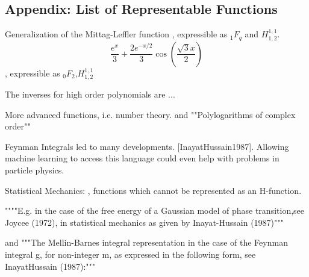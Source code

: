 \documentclass{article}
\begin{document}

\subsection{Appendix: List of Representable Functions}
Generalization of the Mittag-Leffler function \citep{Rathie2017}, expressible as $_1F_q$ and $H^{1,1}_{1,2}$.
$$
\frac{e^x}{3} + \frac{2 e^{-x/2}}{3}\cos(\frac{\sqrt{3}x}{2})
$$ \citep{Rathie2017}, expressible as $_0F_2$,$H^{1,1}_{1,2}$


The inverses for high order polynomials are ...
\citep{Irwin2017}

More advanced functions, i.e. number theory.
and ""Polylogarithms of complex order"" \citep{Rathie1997}

Feynman Integrals led to many developments. [InayatHussain1987]. Allowing machine learning to access this language could even help with problems in particle physics.

Statistical Mechanics: \citep{Rathie1997}, functions which cannot be represented as an H-function. 

""""E.g. in the case of the free energy of
a Gaussian model of phase transition,see Joycee (1972), in statistical mechanics
as given by Inayat-Hussain (1987)""" \citep{Rathie1997} \citep{Inayat Hussain 1987}

and """The Mellin-Barnes integral representation in the case of the Feynman
integral g, for non-integer m, as expressed in the following form, see InayatHussain (1987):"""
\end{document}
